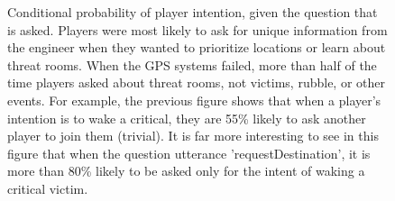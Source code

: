 \begin{figure}[h!]
    \centering
    \caption{%
        Conditional probability of player intention, given the question that is
        asked. Players were most likely to ask for unique information from the
        engineer when they wanted to prioritize locations or learn about threat
        rooms. When the GPS systems failed, more than half of the time players
        asked about threat rooms, not victims, rubble, or other events. For
        example, the previous figure shows that when a player's intention is to
        wake a critical, they are 55\% likely to ask another player to join
        them (trivial). It is far more interesting to see in this figure that
        when the question utterance 'requestDestination', it is more than 80\%
        likely to be asked only for the intent of waking a critical victim.
    }
\end{figure}


